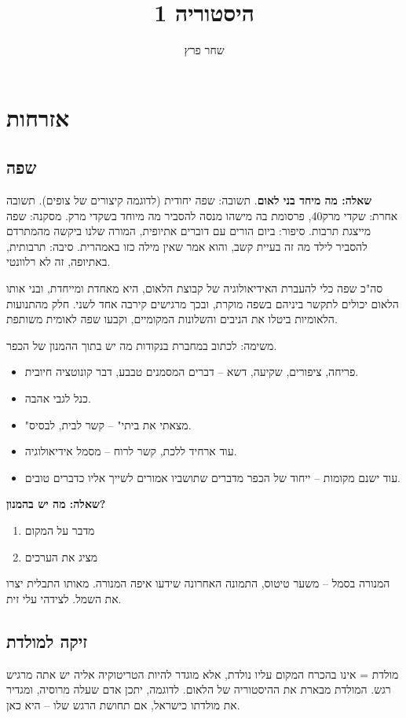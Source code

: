 \documentclass[]{article}
\author{שחר פרץ}
\title{היסטוריה 1}
\begin{document}
	\maketitle
	\section{אזרחות}
	\subsection{שפה}
	\textbf{שאלה: מה מיחד בני לאום}. תשובה: שפה יחודית (לדוגמה קיצורים של צופים). תשובה אחרת: שקדי מרק40, פרסומת בה מישהו מנסה להסביר מה מיוחד בשקדי מרק. מסקנה: שפה מייצגת תרבות. סיפור: ביום הורים עם דוברים אתיופית, המורה שלנו ביקשה מהמתרדם להסביר לילד מה זה בעיית קשב, והוא אמר שאין מילה כזו באמהרית. סיבה: תרבותית, באתיופה, זה לא רלוונטי. 
	
	סה"כ שפה כלי להעברת האידיאולוגיה של קבוצת הלאום, היא מאחדת ומייחדת, ובני אותו הלאום יכולים לתקשר ביניהם בשפה מוקרת, ובכך מרגישים קירבה אחד לשני. חלק מהתנועות הלאומיות ביטלו את הניבים והשלונות המקומיים, וקבעו שפה לאומית משותפת. 
	
	משימה: לכתוב במחברת בנקודות מה יש בתוך ההמנון של הכפר. 
	\begin{itemize}
		\item פריחה, ציפורים, שקיעה, דשא – דברים המסמנים טבבע, דבר קונוטציה חיובית. 
		\item כנל לגבי אהבה. 
		\item "מצאתי את ביתי" – קשר לבית, לבסיס. 
		\item עוד ארחיד ללכת, קשר לרוח – מסמל אידיאולוגיה. 
		\item עוד ישנם מקומות – ייחוד של הכפר מדברים שתושביו אמורים לשייך אליו כדברים טובים. 
	\end{itemize}
	
	\textbf{שאלה: מה יש בהמנון?}
	
	\begin{enumerate}
		\item מדבר על המקום
		\item מציג את הערכים
	\end{enumerate}
	
	המנורה בסמל – משער טיטוס, התמונה האחרונה שידעו איפה המנורה. מאותו התבלית יצרו את השמל. לצידהי עלי זית. 
	
	\subsection{זיקה למולדת}
	מולדת = אינו בהכרח המקום עליו נולדת, אלא מוגדר להיות הטריטוקיה אליה יש אתה מרגיש רגש. המולדת מבארת את ההיסטוריה של הלאום. לדוגמה, יתכן אדם שעלה מרוסיה, ומגדיר את מולדתו כישראל, אם תחושת הרגש שלו – היא כאן. 
	
\end{document}
